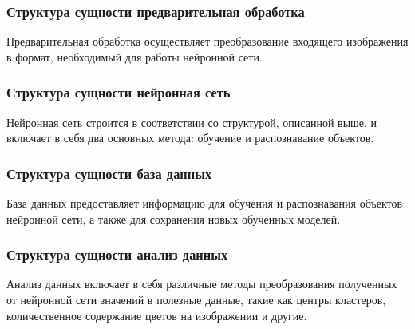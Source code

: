 \subsubsection{Структура сущности предварительная обработка}
Предварительная обработка осуществляет преобразование входящего изображения в формат, необходимый для работы нейронной сети.

\subsubsection{Структура сущности нейронная сеть}
Нейронная сеть строится в соответствии со структурой, описанной выше, и включает в себя два основных метода: обучение и распознавание объектов.

\subsubsection{Структура сущности база данных}
База данных предоставляет информацию для обучения и распознавания объектов нейронной сети, а также для сохранения новых обученных моделей.

\subsubsection{Структура сущности анализ данных}
Анализ данных включает в себя различные методы преобразования полученных от нейронной сети значений в полезные данные, такие как центры кластеров, количественное содержание цветов на изображении и другие.